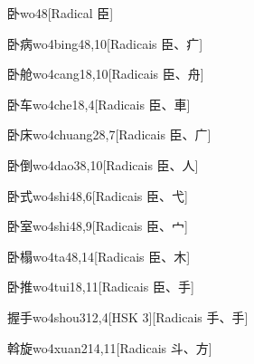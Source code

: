 \begin{entry}{卧}{wo4}{8}[Radical ⾂]
\end{entry}

\begin{entry}{卧病}{wo4bing4}{8,10}[Radicais ⾂、⽧]
\end{entry}

\begin{entry}{卧舱}{wo4cang1}{8,10}[Radicais ⾂、⾈]
\end{entry}

\begin{entry}{卧车}{wo4che1}{8,4}[Radicais ⾂、⾞]
\end{entry}

\begin{entry}{卧床}{wo4chuang2}{8,7}[Radicais ⾂、⼴]
\end{entry}

\begin{entry}{卧倒}{wo4dao3}{8,10}[Radicais ⾂、⼈]
\end{entry}

\begin{entry}{卧式}{wo4shi4}{8,6}[Radicais ⾂、⼷]
\end{entry}

\begin{entry}{卧室}{wo4shi4}{8,9}[Radicais ⾂、⼧]
\end{entry}

\begin{entry}{卧榻}{wo4ta4}{8,14}[Radicais ⾂、⽊]
\end{entry}

\begin{entry}{卧推}{wo4tui1}{8,11}[Radicais ⾂、⼿]
\end{entry}

\begin{entry}{握手}{wo4shou3}{12,4}[HSK 3][Radicais ⼿、⼿]
\end{entry}

\begin{entry}{斡旋}{wo4xuan2}{14,11}[Radicais ⽃、⽅]
\end{entry}

